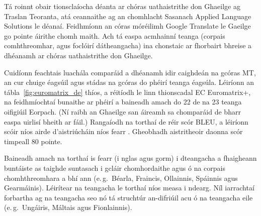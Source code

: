 \begin{multicols}{2}
Tá roinnt obair tionsclaíocha déanta ar chóras uathaistrithe don Ghaeilge ag Traslan Teoranta, atá ceannaithe ag an chomhlacht Sasanach Applied Language Solutions le déanaí. Feidhmíonn an córas móréilimh Google Translate le Gaeilge go pointe áirithe chomh maith. Ach tá easpa acmhainní teanga (corpais comhthreomhar, agus foclóirí dátheangacha) ina chonstaic ar fhorbairt bhreise a dhéanamh ar chóras uathaistrithe don Ghaeilge.

Cuidíonn feachtais luachála comparáid a dhéanamh idir caighdeán na gcóras MT, an cur chuige éagsúil agus stádas na gcóras do phéirí teanga éagsúla. Léiríonn an tábla~\ref{fig:euromatrix_de} thíos, a réitíodh le linn thionscadal EC Euromatrix+, na feidhmíochtaí bunaithe ar phéirí a baineadh amach do 22 de na 23 teanga oifigiúil Eorpach. (Ní raibh an Ghaeilge san áireamh sa chomparáid de bharr easpa uirlisí bheith ar fáil.) Rangaíodh na torthaí de réir scór BLEU, a léiríonn scóir níos airde d’aistriúcháin níos fearr \cite{bleu1}. Gheobhadh aistritheoir daonna scór timpeall 80 pointe.

Baineadh amach na torthaí is fearr (i nglas agus gorm) i dteangacha a fhaigheann buntáiste as taighde suntasach i gcláir chomhordaithe agus ó na corpais chomhthreomhara a bhí ann (e.\,g.~Béarla, Fraincis, Ollainnis, Spáinnis agus Gearmáinis). Léirítear na teangacha le torthaí níos measa i ndearg. Níl iarrachtaí forbartha ag na teangacha seo nó tá struchtúr an-difriúil acu ó na teangacha eile (e.\,g.~Ungáiris, Máltais agus Fionlainnis).


\end{multicols}
